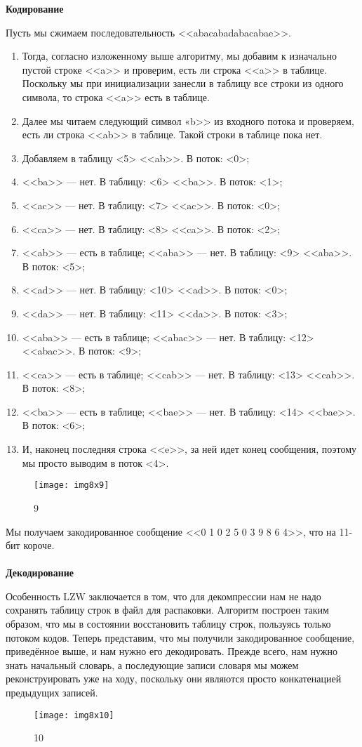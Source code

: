 \noindent\textbf{Кодирование}

Пусть мы сжимаем последовательность <<abacabadabacabae>>.
\begin{enumerate}
\item Тогда, согласно изложенному выше алгоритму, мы добавим к изначально
    пустой строке <<a>> и проверим, есть ли строка <<a>> в таблице. Поскольку мы
    при инициализации занесли в таблицу все строки из одного символа, то
    строка <<a>> есть в таблице.
\item Далее мы читаем следующий символ «b>> из входного потока и проверяем,
    есть ли строка <<ab>> в таблице. Такой строки в таблице пока нет.
\item Добавляем в таблицу <5> <<ab>>. В поток: <0>;
\item <<ba>> — нет. В таблицу: <6> <<ba>>. В поток: <1>;
\item <<ac>> — нет. В таблицу: <7> <<ac>>. В поток: <0>;
\item <<ca>> — нет. В таблицу: <8> <<ca>>. В поток: <2>;
\item <<ab>> — есть в таблице; <<aba>> — нет. В таблицу: <9> <<aba>>. В
    поток: <5>;
\item <<ad>> — нет. В таблицу: <10> <<ad>>. В поток: <0>;
\item <<da>> — нет. В таблицу: <11> <<da>>. В поток: <3>;
\item <<aba>> — есть в таблице; <<abac>> — нет. В таблицу: <12> <<abac>>. В
    поток: <9>;
\item <<ca>> — есть в таблице; <<cab>> — нет. В таблицу: <13> <<cab>>. В
    поток: <8>;
\item <<ba>> — есть в таблице; <<bae>> — нет. В таблицу: <14> <<bae>>. В
    поток: <6>;
\item И, наконец последняя строка <<e>>, за ней идет конец сообщения,
    поэтому мы просто выводим в поток <4>.
\end{enumerate}
\begin{figure}[!htbp]
  \centering
  \texttt{[image: img8x9]}
  \caption{9}\label{img:8x9}
\end{figure}
Мы получаем закодированное сообщение <<0 1 0 2 5 0 3 9 8 6 4>>, что на
11-бит короче.\\
\vspace{1cm}
\\
\noindent\textbf{Декодирование}

Особенность LZW заключается в том, что для декомпрессии нам не надо сохранять
таблицу строк в файл для распаковки. Алгоритм построен таким образом, что мы
в состоянии восстановить таблицу строк, пользуясь только потоком кодов.
Теперь представим, что мы получили закодированное сообщение, приведённое
выше, и нам нужно его декодировать. Прежде всего, нам нужно знать начальный
словарь, а последующие записи словаря мы можем реконструировать уже на ходу,
поскольку они являются просто конкатенацией предыдущих записей.
\begin{figure}[!htbp]
  \centering
  \texttt{[image: img8x10]}
  \caption{10}\label{img:8x10}
\end{figure}

